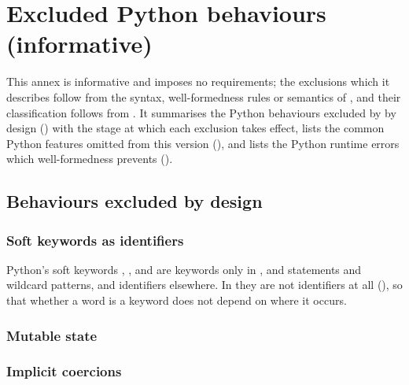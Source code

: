 \chapter{Excluded Python behaviours (informative)}
\label{sec:exclusions}

This annex is informative and imposes no requirements; the exclusions which it describes follow from
the syntax, well-formedness rules or semantics of \PurePy, and their classification follows from
. It summarises the Python behaviours excluded by \PurePy{} by design
() with the stage at which each
exclusion takes effect, lists the common Python features omitted from this version
(), and lists the Python runtime errors which well-formedness prevents
().

\section{Behaviours excluded by design}
\label{sec:excluded-by-design}

\subsection{Soft keywords as identifiers}
\label{sec:soft-keywords}

Python's soft keywords , ,  and \pyinline{_} are keywords only in
,  and  statements and wildcard patterns, and identifiers elsewhere. In
\PurePy they are not identifiers at all (), so that whether a word is a keyword does not depend on
where it occurs.

\subsection{Mutable state}
\label{sec:no-mutable-state}



\subsection{Implicit coercions}
\label{sec:no-coercions}




